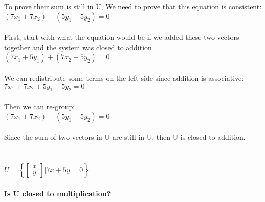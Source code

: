 \documentclass{article}
\begin{document}
To prove their sum is still in U, We need to prove that this equation is consistent: $(7x_{1} + 7x_{2}) + (5y_{1} + 5y_{2}) = 0$\\
\\
First, start with what the equation would be if we added these two vectors together and the system was closed to addition\\
$(7x_{1} + 5y_{1}) + (7x_{2} + 5y_{2}) = 0$\\
\\
We can redistribute some terms on the left side since addition is associative:\\
$7x_{1} + 7x_{2}  +  5y_{1} + 5y_{2} = 0$\\
\\
Then we can re-group:\\
$(7x_{1} + 7x_{2}) + (5y_{1} + 5y_{2}) = 0$\\
\\
Since the sum of two vectors in U are still in U,  then U is closed to addition.\\
\\
\newpage
\\
\noindent $U = \left\{ \left[ 
\begin{matrix} x \\ y \end{matrix} 
\right] \Bigg|  7x+5y=0  \right\}$\\
\\
\noindent \textbf{Is U closed to multiplication?}
\end{document}
